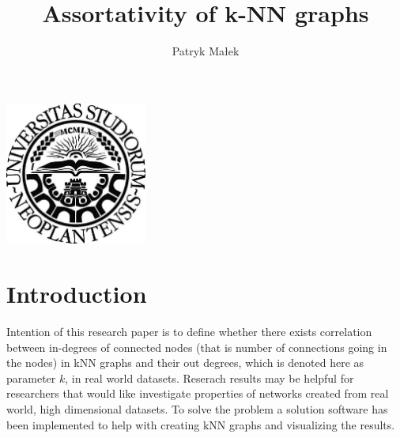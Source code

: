 \documentclass[a4paper,11pt]{article}
\newcommand{\mahtitle}{Assortativity of k-NN graphs}
\begin{document}
\label{Title} 
\title{\vspace{1pc} \mahtitle \vspace{4pc}}
\author{Patryk Małek \vspace{-0.7pc}}
\date{}
\maketitle
\thispagestyle{empty}


\vspace{6pc}
\centerline{
\includegraphics[width=0.35\textwidth,height=0.35\textheight,keepaspectratio]{NoviSadLogoGray.jpg}
}
\vspace{8pc}

\clearpage
\begin{abstract}
\label{Abstract}

\end{abstract}


\clearpage
\tableofcontents


\clearpage
\section{Introduction} 
Intention of this research paper is to define whether there exists correlation between in-degrees of connected nodes (that is number of connections going in the nodes) in kNN graphs and their out degrees, which is denoted here as parameter $k$, in real world datasets.
Reserach results may be helpful for researchers that would like investigate properties of networks created from real world, high dimensional datasets.
To solve the problem a solution software has been implemented to help with creating kNN graphs and visualizing the results.

\end{document}
